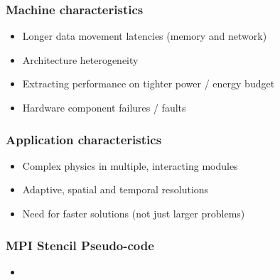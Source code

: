 \begin{frame}[fragile]
  \frametitle{Machine characteristics}
  \begin{itemize}
  \item Longer data movement latencies (memory and network)
  \item Architecture heterogeneity
  \item Extracting performance on tighter power / energy budget
  \item Hardware component failures / faults
  \end{itemize}
\end{frame}

\begin{frame}[fragile]
  \frametitle{Application characteristics}
  \begin{itemize}
  \item Complex physics in multiple, interacting modules
  \item Adaptive, spatial and temporal resolutions
  \item Need for faster solutions (not just larger problems)
  \end{itemize}
\end{frame}

\begin{frame}[fragile]
  \frametitle{MPI Stencil Pseudo-code}
  \begin{itemize}
  \item 
  \end{itemize}
\end{frame}